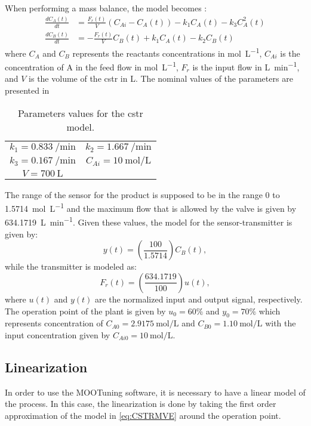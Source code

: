 When performing a mass balance, the model becomes \citep{Arrieta2010}:
%
\begin{equation}
\begin{split}
\frac{dC_A(t)}{dt} & = \frac{F_r(t)}{V} \left(C_{Ai}-C_A(t)\right) - k_1 C_A(t) - k_3 C^2_A(t)\\
\frac{dC_B(t)}{dt} & = -\frac{F_r(t)}{V} C_B(t)+ k_1 C_A(t) - k_2 C_B(t)
\end{split}
\label{eq:CSTRMVE}
\end{equation}
%
where $C_A$ and $C_B$ represents the reactants concentrations  in \si{\mole\per\liter}, $C_{Ai}$ is the concentration of A in the feed flow in \si{\mole\per\liter}, $F_r$ is the input flow in \si{\liter\per\minute}, and $V$ is the volume of the \gls{cstr} in \si{\liter}. The nominal values of the parameters are presented in %
%
\begin{table}[tb]
	\centering
	\caption{Parameters values for the \gls{cstr} model.}
	\begin{tabular}{cc}
		\toprule
		$k_1 = \SI{0.833}{\per\minute}$ & $k_2 = \SI{1.667}{\per\minute}$ \\
		$k_3 = \SI{0.167}{\per\minute}$ & $C_{Ai} = \SI{10}{\mole\per\liter}$\\
		$V = \SI{700}{\liter}$\\
		\bottomrule
	\end{tabular}
	\label{tab:ParamCSTR}
\end{table}
%

The range of the sensor for the product is supposed to be in the range 0 to \SI{1.5714}{\mole\per\liter} and the maximum flow that is allowed by the valve is given by \SI{634.1719}{\liter\per\minute}. Given these values, the model for the sensor-transmitter is given by:
\begin{equation}
	y(t) = \left(\frac{100}{1.5714}\right) C_B(t),
	\label{eq:Sensor}
\end{equation}
%
while the transmitter is modeled as:
\begin{equation}
F_r(t) = \left(\frac{634.1719}{100}\right) u(t),
\label{eq:Sensor}
\end{equation}
%
where $u(t)$ and $y(t)$ are the normalized input and output signal, respectively. The operation point of the plant is given by $u_0 = 60\%$ and $y_0 = 70\%$ which represents concentration of $C_{A0} = \SI{2.9175}{\mole\per\liter}$ and $C_{B0} = \SI{1.10}{\mole\per\liter}$ with the input concentration given by $C_{Ai0} = \SI{10}{\mole\per\liter}$.

\subsection{Linearization}
\label{sec:CSTRLin}
In order to use the MOOTuning software, it is necessary to have a linear model of the process. In this case, the linearization is done by taking the first order approximation of the model in \eqref{eq:CSTRMVE} around the operation point.

